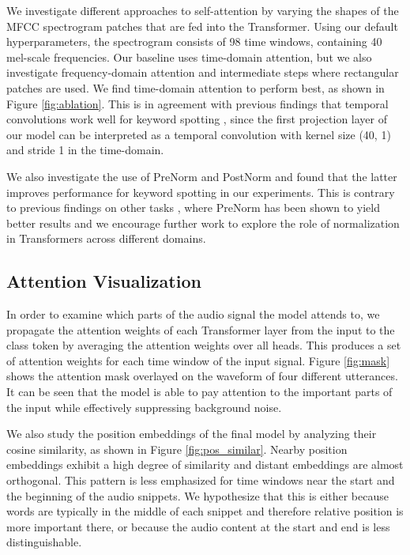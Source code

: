 \documentclass[a4paper]{article}
\begin{document}
We investigate different approaches to self-attention by varying the shapes of the MFCC spectrogram patches that are fed into the Transformer. Using our default hyperparameters, the spectrogram consists of 98 time windows, containing 40 mel-scale frequencies. Our baseline uses time-domain attention, but we also investigate frequency-domain attention and intermediate steps where rectangular patches are used. We find time-domain attention to perform best, as shown in Figure \ref{fig:ablation}. This is in agreement with previous findings that temporal convolutions work well for keyword spotting \cite{choi2019temporal}, since the first projection layer of our model can be interpreted as a temporal convolution with kernel size (40, 1) and stride 1 in the time-domain.

We also investigate the use of PreNorm and PostNorm and found that the latter improves performance for keyword spotting in our experiments. This is contrary to previous findings on other tasks \cite{nguyen2019Transformers}, where PreNorm has been shown to yield better results and we encourage further work to explore the role of normalization in Transformers across different domains.

\subsection{Attention Visualization}
In order to examine which parts of the audio signal the model attends to, we propagate the attention weights of each Transformer layer from the input to the class token by averaging the attention weights over all heads. This produces a set of attention weights for each time window of the input signal. Figure \ref{fig:mask} shows the attention mask overlayed on the waveform of four different utterances. It can be seen that the model is able to pay attention to the important parts of the input while effectively suppressing  background noise. 

We also study the position embeddings of the final model by analyzing their cosine similarity, as shown in Figure \ref{fig:pos_similar}. Nearby position embeddings exhibit a high degree of similarity and distant embeddings are almost orthogonal.
This pattern is less emphasized for time windows near the start and the beginning of the audio snippets. We hypothesize that this is either because words are typically in the middle of each snippet and therefore relative position is more important there, or because the audio content at the start and end is less distinguishable.
\end{document}
